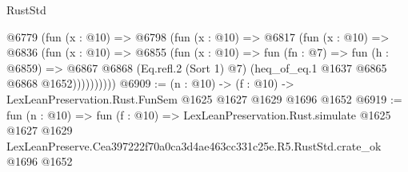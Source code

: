 \begin{lexlean}{RustStd}
\begin{coremodule}
          @6779
            (fun (x : @10) =>
            @6798
              (fun (x : @10) =>
              @6817
                (fun (x : @10) =>
                @6836
                  (fun (x : @10) =>
                  @6855
                    (fun (x : @10) =>
                    fun (fn : @7) =>
                    fun (h : @6859) =>
                    @6867
                      @6868
                      (Eq.refl.{2} (Sort 1) @7)
                      (heq_of_eq.{1} @1637 @6865 @6868 @1652))))))))))
@6909 := (n : @10) -> (f : @10) -> LexLeanPreservation.Rust.FunSem @1625 @1627 @1629 @1696 @1652
@6919 := fun (n : @10) =>
  fun (f : @10) =>
  LexLeanPreservation.Rust.simulate
    @1625
    @1627
    @1629
    LexLeanPreserve.Cea397222f70a0ca3d4ae463cc331c25e.R5.RustStd.crate_ok
    @1696
    @1652
\end{coremodule}
\end{lexlean}
